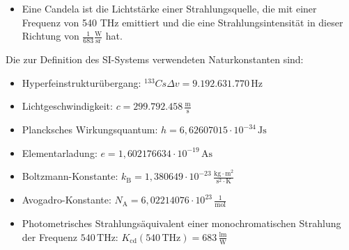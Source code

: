 \begin{frame}[t]
{\begin{itemize}
	\item Eine Candela ist die Lichtstärke einer Strahlungsquelle, die mit einer Frequenz von
	540 THz emittiert und die eine Strahlungsintensität in dieser Richtung 
	von $\frac{1}{683} \frac{\mathrm{W}}{\mathrm{sr}}$ hat. 
\end{itemize}	

Die zur Definition des SI-Systems verwendeten Naturkonstanten sind:

\begin{itemize}
	\item Hyperfeinstrukturübergang: $ ^{133} Cs \Delta v  = 9.192.631.770\,\mathrm{Hz}$

	\item Lichtgeschwindigkeit: $c = 299.792.458\,\frac{\mathrm{m}}{\mathrm{s}}$

	\item Plancksches Wirkungsquantum: $h = 6,626 070 15 \cdot 10^{-34}\,\mathrm{Js}$
	
	\item Elementarladung: $e = 1,602 176 634 \cdot 10^{-19}\,\mathrm{As}$
	
	\item Boltzmann-Konstante: $k_\mathrm{B} = 1,380 649 \cdot 10^{-23} \, \frac{\mathrm{kg \cdot m^2}}{\mathrm{s^2 \cdot K}} $

	\item Avogadro-Konstante: $N_\mathrm{A} = 6,022 140 76 \cdot 10^{23}\,\frac{1}{\mathrm{mol}}$

	\item Photometrisches Strahlungsäquivalent einer monochromatischen Strahlung der Frequenz $540\,\mathrm{THz}$: $K_\mathrm{cd}(540\,\mathrm{THz}) = 683 \, \frac{\mathrm{lm}}{\mathrm{W}}$
\end{itemize}


}



\end{frame}
